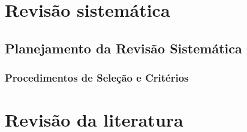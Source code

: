 \begin{comment}
\par
\textcolor{red}{O artigo apresenta aspectos importantes, tais como a utilização de uma ferramenta para geração de assertivas, o que torna-se no contexto deste projeto, extremamente importante, visto que o modelo adotado atualmente consiste tanto na geração automática das assertivas, bem como a inserção manual por parte do usuário.}

\end{comment}

\label{chapter:correlatos}
\section{Revisão sistemática}


\subsection{Planejamento da Revisão Sistemática}


\subsubsection{Procedimentos de Seleção e Critérios}


\section{Revisão da literatura}
